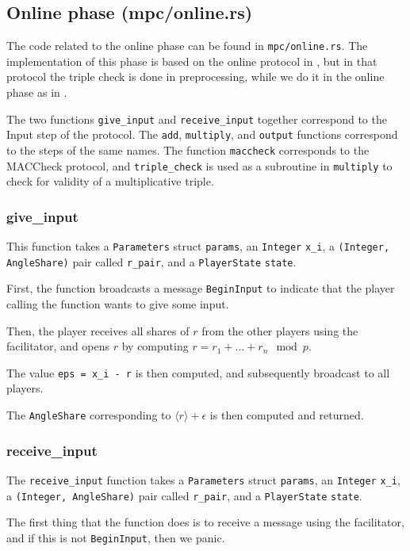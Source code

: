 \documentclass[../main.tex]{subfiles}
\begin{document}
\subsection{Online phase (mpc/online.rs)}
The code related to the online phase can be found in \lstinline{mpc/online.rs}. The implementation of this phase is based on the online protocol in \cite{damgaard2013practical}, but in that protocol the triple check is done in preprocessing, while we do it in the online phase as in \cite{damgaard2012multiparty}.

The two functions \lstinline{give_input} and \lstinline{receive_input} together correspond to the Input step of the protocol.
The \lstinline{add}, \lstinline{multiply}, and \lstinline{output} functions correspond to the steps of the same names.
The function \lstinline{maccheck} corresponds to the MACCheck protocol, and \lstinline{triple_check} is used as a subroutine in \lstinline{multiply} to check for validity of a multiplicative triple.

\subsubsection{give\_input}
This function takes a \lstinline{Parameters} struct \lstinline{params}, an \lstinline{Integer} \lstinline{x_i}, a \lstinline{(Integer, AngleShare)} pair called \lstinline{r_pair}, and a \lstinline{PlayerState} \lstinline{state}.

First, the function broadcasts a message \lstinline{BeginInput} to indicate that the player calling the function wants to give some input.

Then, the player receives all shares of $r$ from the other players using the facilitator, and opens $r$ by computing $r = r_1 + ... + r_n \mod p$.

The value \lstinline{eps = x_i - r} is then computed, and subsequently broadcast to all players.

The \lstinline{AngleShare} corresponding to $\langle r \rangle + \epsilon$ is then computed and returned.
\subsubsection{receive\_input}
The \lstinline{receive_input} function takes a \lstinline{Parameters} struct \lstinline{params}, an \lstinline{Integer} \lstinline{x_i}, a \lstinline{(Integer, AngleShare)} pair called \lstinline{r_pair}, and a \lstinline{PlayerState} \lstinline{state}.

The first thing that the function does is to receive a message using the facilitator, and if this is not \lstinline{BeginInput}, then we panic.
\end{document}

